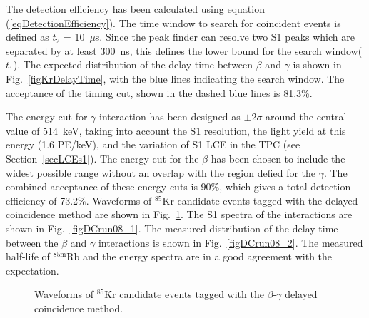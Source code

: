 The detection efficiency has been calculated using equation (\ref{eqDetectionEfficiency}).
The time window to search for coincident events is defined as $t_{2}$ = 10~$\mu$s. Since the peak finder can resolve two S1 peaks which are separated by at least 300~ns, this defines the lower bound for the search window($t_{1}$). The expected distribution of the delay time between $\beta$ and $\gamma$ is shown in Fig.~\ref{figKrDelayTime}, with the blue lines indicating the search window. The acceptance of the timing cut, shown in the dashed blue lines is 81.3\%. \par
The energy cut for $\gamma$-interaction has been designed as $\pm$2$\sigma$ around the central value of 514~keV, taking into account the S1 resolution, the light yield at this energy (1.6 PE/keV), and the variation of S1 LCE in the TPC (see Section~\ref{secLCEs1}). The energy cut for  the $\beta$ has been chosen to include the widest possible range without an overlap with the region defied for the $\gamma$. The combined acceptance of these energy cuts is 90\%, which gives a total detection efficiency of 73.2\%. 
Waveforms of $^{85}$Kr candidate events tagged with the delayed coincidence method are shown in Fig.~\ref{figKr85WF}.  The S1 spectra of the interactions are shown in Fig.~\ref{figDCrun08_1}.  The measured distribution of the delay time between the $\beta$ and $\gamma$ interactions is shown in Fig.~\ref{figDCrun08_2}. The measured half-life of $^{85\mathrm{m}}$Rb and the energy spectra are in a good agreement with the expectation. 

\begin{figure}[!h]
\centering
{}
\caption{Waveforms of $^{85}$Kr candidate events tagged with the $\beta$-$\gamma$ delayed coincidence method.}
\label{figKr85WF}
\end{figure}


